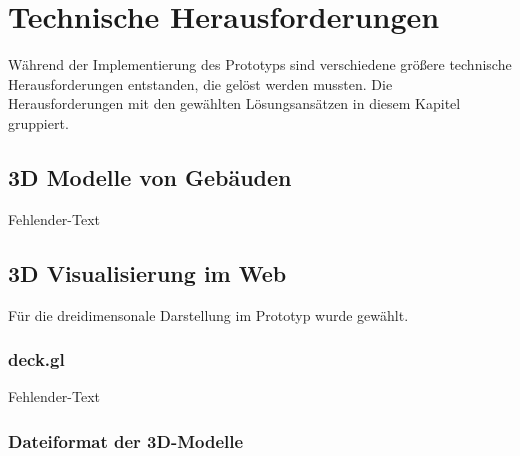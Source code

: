 \newpage
\section{Technische Herausforderungen}
Während der Implementierung des Prototyps sind verschiedene größere technische Herausforderungen entstanden, die gelöst werden mussten. Die Herausforderungen mit den gewählten Lösungsansätzen in diesem Kapitel gruppiert. 

\subsection{3D Modelle von Gebäuden}
Fehlender-Text

\subsection{3D Visualisierung im Web}
Für die dreidimensonale Darstellung im Prototyp wurde \deckgl{} gewählt.

\subsubsection{deck.gl}
Fehlender-Text

\subsubsection{Dateiformat der 3D-Modelle}

